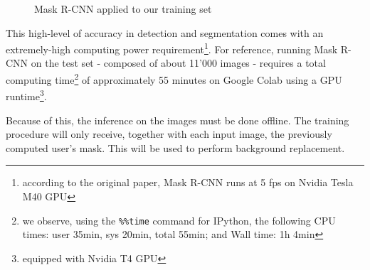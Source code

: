 \begin{figure}[!h]
\begin{center}
\begin{subfigure}[h]{0.32\textwidth}
		\end{subfigure}
	\end{center}
	\vspace{-0.5cm}
	\caption[Mask R-CNN applied to our training set]{Mask R-CNN applied to our training set}
	\label{fig:maskrcnn-dario}
\end{figure}

This high-level of accuracy in detection and segmentation comes with an extremely-high computing power requirement\footnote{according to the original paper, Mask R-CNN runs at 5 \gls{fps} on Nvidia Tesla M40 GPU}. For reference, running Mask R-CNN on the test set - composed of about 11'000 images - requires a total computing time\footnote{we observe, using the \texttt{\%\%time} command for IPython, the following CPU times: user 35min, sys 20min, total 55min; and Wall time: 1h 4min} of approximately 55 minutes on Google Colab using a GPU runtime\footnote{equipped with Nvidia T4 GPU}.

Because of this, the inference on the images must be done offline. The training procedure will only receive, together with each input image, the previously computed user's mask. This will be used to perform background replacement.









